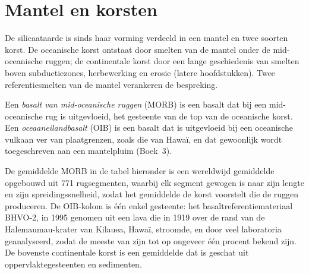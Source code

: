 \section{Mantel en korsten}

De silicaataarde is sinds haar vorming verdeeld in een mantel en twee
soorten korst. De oceanische korst ontstaat door smelten van de mantel onder de
mid-oceanische ruggen; de continentale korst door een lange geschiedenis van smelten boven
subductiezones, herbewerking en erosie (latere hoofdstukken). Twee referentiesmelten
van de mantel verankeren de bespreking.

\begin{definition}
\label{def:b2:elements-in-the-earth:morb-oib}
Een \emph{basalt van mid-oceanische ruggen} (MORB) is een basalt
dat bij een mid-oceanische rug is uitgevloeid, het gesteente van de top van de oceanische korst. Een
\emph{oceaaneilandbasalt} (OIB) is een basalt dat is uitgevloeid
bij een oceanische vulkaan ver van plaatgrenzen, zoals die van Hawaï,
en dat gewoonlijk wordt toegeschreven aan een mantelpluim (Boek~3).
\end{definition}

De gemiddelde MORB in de tabel hieronder is een wereldwijd gemiddelde opgebouwd uit 771
rugsegmenten, waarbij elk segment gewogen is naar zijn lengte en zijn spreidingssnelheid, zodat het
gemiddelde de korst voorstelt die de ruggen produceren. De
OIB-kolom is één enkel gesteente: het basaltreferentiemateriaal BHVO-2, in 1995 genomen
uit een lava die in 1919 over de rand van de Halemaumau-krater van Kilauea, Hawaï, stroomde,
en door veel laboratoria geanalyseerd, zodat de meeste van zijn  tot op
ongeveer één procent bekend zijn. De bovenste continentale korst is een gemiddelde dat is geschat uit
oppervlaktegesteenten en sedimenten.

